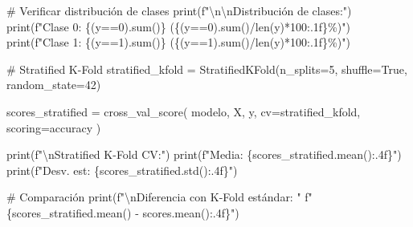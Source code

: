 \documentclass[
  doc,
  floatsintext,
  longtable,
  a4paper,
  nolmodern,
  notxfonts,
  notimes,
  12pt,
  colorlinks=true,linkcolor=blue,citecolor=blue,urlcolor=blue]{apa7}
\newenvironment{Shaded}{\begin{snugshade}}{\end{snugshade}}
\newcommand{\BuiltInTok}[1]{\textcolor[rgb]{0.00,0.23,0.31}{#1}}
\newcommand{\CharTok}[1]{\textcolor[rgb]{0.13,0.47,0.30}{#1}}
\newcommand{\CommentTok}[1]{\textcolor[rgb]{0.37,0.37,0.37}{#1}}
\newcommand{\DecValTok}[1]{\textcolor[rgb]{0.68,0.00,0.00}{#1}}
\newcommand{\NormalTok}[1]{\textcolor[rgb]{0.00,0.23,0.31}{#1}}
\newcommand{\OperatorTok}[1]{\textcolor[rgb]{0.37,0.37,0.37}{#1}}
\newcommand{\SpecialCharTok}[1]{\textcolor[rgb]{0.37,0.37,0.37}{#1}}
\newcommand{\SpecialStringTok}[1]{\textcolor[rgb]{0.13,0.47,0.30}{#1}}
\newcommand{\StringTok}[1]{\textcolor[rgb]{0.13,0.47,0.30}{#1}}
\newcommand{\VariableTok}[1]{\textcolor[rgb]{0.07,0.07,0.07}{#1}}
\begin{document}
\begin{Shaded}
\begin{Highlighting}[]
\CommentTok{\# Verificar distribución de clases}
\BuiltInTok{print}\NormalTok{(}\SpecialStringTok{f"}\CharTok{\textbackslash{}n\textbackslash{}n}\SpecialStringTok{Distribución de clases:"}\NormalTok{)}
\BuiltInTok{print}\NormalTok{(}\SpecialStringTok{f"Clase 0: }\SpecialCharTok{\{}\NormalTok{(y}\OperatorTok{==}\DecValTok{0}\NormalTok{)}\SpecialCharTok{.}\BuiltInTok{sum}\NormalTok{()}\SpecialCharTok{\}}\SpecialStringTok{ (}\SpecialCharTok{\{}\NormalTok{(y}\OperatorTok{==}\DecValTok{0}\NormalTok{)}\SpecialCharTok{.}\BuiltInTok{sum}\NormalTok{()}\OperatorTok{/}\BuiltInTok{len}\NormalTok{(y)}\OperatorTok{*}\DecValTok{100}\SpecialCharTok{:.1f\}}\SpecialStringTok{\%)"}\NormalTok{)}
\BuiltInTok{print}\NormalTok{(}\SpecialStringTok{f"Clase 1: }\SpecialCharTok{\{}\NormalTok{(y}\OperatorTok{==}\DecValTok{1}\NormalTok{)}\SpecialCharTok{.}\BuiltInTok{sum}\NormalTok{()}\SpecialCharTok{\}}\SpecialStringTok{ (}\SpecialCharTok{\{}\NormalTok{(y}\OperatorTok{==}\DecValTok{1}\NormalTok{)}\SpecialCharTok{.}\BuiltInTok{sum}\NormalTok{()}\OperatorTok{/}\BuiltInTok{len}\NormalTok{(y)}\OperatorTok{*}\DecValTok{100}\SpecialCharTok{:.1f\}}\SpecialStringTok{\%)"}\NormalTok{)}

\CommentTok{\# Stratified K{-}Fold}
\NormalTok{stratified\_kfold }\OperatorTok{=}\NormalTok{ StratifiedKFold(n\_splits}\OperatorTok{=}\DecValTok{5}\NormalTok{, shuffle}\OperatorTok{=}\VariableTok{True}\NormalTok{, random\_state}\OperatorTok{=}\DecValTok{42}\NormalTok{)}

\NormalTok{scores\_stratified }\OperatorTok{=}\NormalTok{ cross\_val\_score(}
\NormalTok{    modelo, X, y,}
\NormalTok{    cv}\OperatorTok{=}\NormalTok{stratified\_kfold,}
\NormalTok{    scoring}\OperatorTok{=}\StringTok{\textquotesingle{}accuracy\textquotesingle{}}
\NormalTok{)}

\BuiltInTok{print}\NormalTok{(}\SpecialStringTok{f"}\CharTok{\textbackslash{}n}\SpecialStringTok{Stratified K{-}Fold CV:"}\NormalTok{)}
\BuiltInTok{print}\NormalTok{(}\SpecialStringTok{f"Media: }\SpecialCharTok{\{}\NormalTok{scores\_stratified}\SpecialCharTok{.}\NormalTok{mean()}\SpecialCharTok{:.4f\}}\SpecialStringTok{"}\NormalTok{)}
\BuiltInTok{print}\NormalTok{(}\SpecialStringTok{f"Desv. est: }\SpecialCharTok{\{}\NormalTok{scores\_stratified}\SpecialCharTok{.}\NormalTok{std()}\SpecialCharTok{:.4f\}}\SpecialStringTok{"}\NormalTok{)}

\CommentTok{\# Comparación}
\BuiltInTok{print}\NormalTok{(}\SpecialStringTok{f"}\CharTok{\textbackslash{}n}\SpecialStringTok{Diferencia con K{-}Fold estándar: "}
      \SpecialStringTok{f"}\SpecialCharTok{\{}\NormalTok{scores\_stratified}\SpecialCharTok{.}\NormalTok{mean() }\OperatorTok{{-}}\NormalTok{ scores}\SpecialCharTok{.}\NormalTok{mean()}\SpecialCharTok{:.4f\}}\SpecialStringTok{"}\NormalTok{)}
\end{Highlighting}
\end{Shaded}
\end{document}
